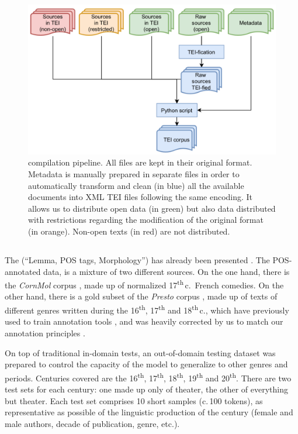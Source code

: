 \begin{figure}[ht]
    \centering
    \includegraphics[width=0.75\linewidth]{static/media/mod_eval/dalembert/corpus_trans.png}
    \caption{\freemmax compilation pipeline. All files are kept in their original format. Metadata is manually prepared in separate files in order to automatically transform and clean (in blue) all the available documents into XML TEI files following the same encoding. It allows us to distribute open data (in green) but also data distributed with restrictions regarding the modification of the original format (in orange). Non-open texts (in red) are not distributed.}
    \label{fig:pipeline}
\end{figure}

\subsection{\texorpdfstring{\freemlpm}{FREEM LPM}}\label{freem_lpm}

The \freemlpm (``Lemma, POS tags, Morphology'') has already been presented \citep{gabay-etal-2020-standardizing}. The POS-annotated data, is a mixture of two different sources. On the one hand, there is the \emph{CornMol} corpus \citep{camps-etal-2021-corpus}, made up of normalized 17\textsuperscript{th}\,c.~French comedies. On the other hand, there is a gold subset of the \emph{Presto} corpus \citep{blumenthal-etal-2017-presto}, made up of texts of different genres written during the 16\textsuperscript{th}, 17\textsuperscript{th} and 18\textsuperscript{th}\,c., which have previously used to train annotation tools \citep{diwersy-etal-2017-ressources}, and was heavily corrected by us to match our annotation principles \citep{gabay-etal-2020-manuel}.

On top of traditional in-domain tests, an out-of-domain testing dataset was prepared to control the capacity of the model to generalize to other genres and periods. Centuries covered are the 16\textsuperscript{th}, 17\textsuperscript{th}, 18\textsuperscript{th}, 19\textsuperscript{th} and 20\textsuperscript{th}. There are two test sets for each century: one made up only of theater, the other of everything but theater. Each test set comprises 10 short samples (c.\,100 tokens), as representative as possible of the linguistic production of the century (female and male authors, decade of publication, genre, etc.).

